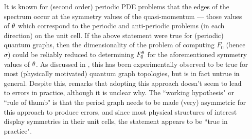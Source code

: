 It is known for (second order) periodic PDE problems that the edges of the spectrum occur at the symmetry values of the quasi-momentum --- those values of $\theta$ which correspond to the periodic and anti-periodic problems (in each direction) on the unit cell.
If the above statement were true for (periodic) quantum graphs, then the dimensionality of the problem of computing $F_0$ (hence $\sigma$) could be reliably reduced to determining $F_0^\theta$ for the aforementioned symmetry values of $\theta$.
As discussed in \cite[Chapter 4.6]{berkolaiko2013introduction}, this has been experimentally observed to be true for most (physically motivated) quantum graph topologies, but is in fact untrue in general.
Despite this, \cite[Chapter 4.6]{berkolaiko2013introduction} remarks that adopting this approach doesn't seem to lead to errors in practice, although it is unclear why.
The ``working hypothesis" or ``rule of thumb" is that the period graph needs to be made (very) asymmetric for this approach to produce errors, and since most physical structures of interest display symmetries in their unit cells, the statement appears to be ``true in practice".

